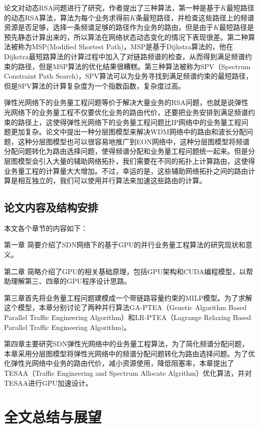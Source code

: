 \documentclass[master]{thesis-uestc}
\begin{document}
论文对动态RSA问题进行了研究，作者提出了三种算法，第一种是基于$K$最短路径的动态RSA算法，算法为每个业务求得前$K$条最短路径，并检查这些路径上的频谱资源是否足够，选择一条频谱足够的路径作为业务的路由，但是由于$K$最短路径是预先静态计算出来的，所以算法在网络状态动态变化的情况下表现很差。第二种算法被称为MSP(Modified Shortest Path)，MSP是基于Dijkstra算法的，他在Dijkstra最短路算法的计算过程中加入了对链路频谱的检查，从而得到满足频谱约束的路径，但是MSP算法的优化结果很糟糕。第三种算法被称为SPV（Spectrum Constraint Path Search)，SPV算法可以为业务寻找到满足频谱约束的最短路径，但是SPV算法的计算复杂度为一个指数函数，复杂度过高。

弹性光网络下的业务量工程问题等价于解决大量业务的RSA问题，也就是说弹性光网络下的业务量工程不仅要优化业务的路由代价，还要把业务安排到满足频谱约束的路径上，这使得弹性光网络下的业务量工程问题比IP网络中的业务量工程问题更加复杂。论文中提出一种分层图模型来解决WDM网络中的路由和波长分配问题，这种分层图模型也可以很容易地推广到EON网络中，这种分层图模型将频谱分配问题转化为路由选择问题，使得频谱分配和业务量工程问题统一起来。但是分层图模型会引入大量的辅助网络拓扑，我们需要在不同的拓扑上计算路由，这使得业务量工程的计算量大大增加。不过，幸运的是，这些辅助网络拓扑之间的路由计算是相互独立的，我们可以使用并行算法来加速这些路由的计算。

\section{论文内容及结构安排}
本文各个章节的内容如下：

第一章 简要介绍了SDN网络下的基于GPU的并行业务量工程算法的研究现状和意义。

第二章 简略介绍了GPU的相关基础原理，包括GPU架构和CUDA编程模型，以帮助理解第三、四章的GPU程序设计思路。

第三章首先将业务量工程问题建模成一个带链路容量约束的MILP模型。为了求解这个模型，本章分别讨论了两种并行算法GA-PTEA（Genetic Algorithm Based Parallel Traffic Engineering Algorithm）和LR-PTEA（Lagrange Relaxing Based Parallel Traffic Engineering Algorithm)。

第四章主要研究SDN弹性光网络中的业务量工程算法，为了简化频谱分配问题，本章采用分层图模型将弹性光网络中的频谱分配问题转化为路由选择问题。为了优化弹性光网络中业务的路由代价，减小资源使用，降低阻塞率，本章提出了TESAA（Traffic Engineering and Spectrum Allocate Algrithm）优化算法，并对TESAA进行GPU加速设计。




\chapter{全文总结与展望}
\end{document}
